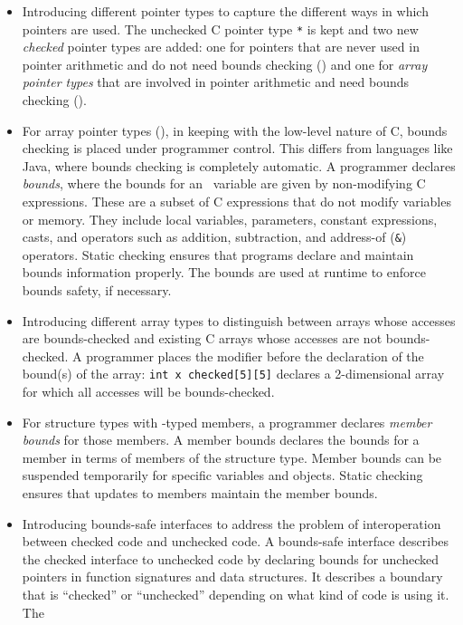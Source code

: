 \begin{itemize}
\item
  Introducing different pointer types to capture the different ways in
  which pointers are used. The unchecked C pointer type \texttt{*} is kept
  and two new {\it checked} pointer types are added: one for pointers that
  are never used in pointer arithmetic and do not need bounds checking (\ptr)
  and one for \emph{array pointer types} that are involved in pointer
  arithmetic and need bounds checking (\arrayptr).
\item
  For array pointer types (\arrayptr), in keeping with the low-level
  nature of C,  bounds checking is placed under programmer control. 
  This differs from languages like
  Java, where bounds checking is completely automatic. A programmer
  declares \emph{bounds}, where the bounds for an \arrayptr\
  variable are given by non-modifying C expressions. These are a subset
  of C expressions that do not modify variables or memory. They include
  local variables, parameters, constant expressions, casts, and
  operators such as addition, subtraction, and address-of (\texttt{\&})
  operators. Static checking ensures that programs declare and maintain
  bounds information properly. The bounds are used at runtime to enforce
  bounds safety, if necessary.
\item
  Introducing different array types to distinguish between arrays whose
  accesses are bounds-checked and existing C arrays whose accesses are
  not bounds-checked. A programmer places the modifier 
  before the declaration of the bound(s) of the array: \texttt{int x
  checked[5][5]} declares a 2-dimensional array for which all
  accesses will be bounds-checked.
\item
  For structure types with \arrayptr -typed members, a
  programmer declares \emph{member bounds} for those members. A member
  bounds declares the bounds for a member in terms of members of the
  structure type. Member bounds can be suspended temporarily for
  specific variables and objects. Static checking ensures that updates
  to members maintain the member bounds.
\item
  Introducing bounds-safe interfaces to address the problem of
  interoperation between checked code and unchecked code. A bounds-safe
  interface describes the checked interface to unchecked code by declaring
  bounds for unchecked pointers in function signatures and data structures.
  It describes a boundary that is ``checked'' or ``unchecked''
  depending on what kind of code is using it. The

\end{itemize}
